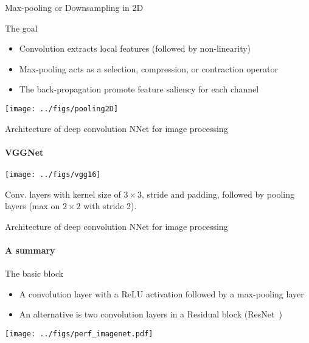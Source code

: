 \begin{frame}{Max-pooling or Downsampling in 2D}
  \begin{block}{The goal}
    \begin{itemize}
    \item Convolution extracts local features (followed by non-linearity)
    \item Max-pooling acts as a selection, compression, or contraction operator
    \item The back-propagation promote feature saliency for each channel
    \end{itemize}
  \end{block}
  \begin{center}
    \texttt{[image: ../figs/pooling2D]}
  \end{center}
\end{frame}

\begin{frame}{Architecture of deep convolution NNet for image processing}
  \framesubtitle{VGGNet~\cite{Simonyan15VGG}}
  \begin{center}
    \texttt{[image: ../figs/vgg16]}
  \end{center}
  Conv. layers with kernel size of $3\times 3$, stride and padding,
  followed by pooling layers (max on $2\times 2$ with stride 2).
\end{frame}

\begin{frame}{Architecture of deep convolution NNet for image processing}
  \framesubtitle{A summary}
  \begin{block}{The basic block}
    \begin{itemize}
    \item A convolution layer with a ReLU activation followed by a max-pooling layer
    \item An alternative is two convolution layers in a Residual block (ResNet~\cite{He16Residual})
    \end{itemize}
  \end{block}
  \begin{center}
    \texttt{[image: ../figs/perf\_imagenet.pdf]}
  \end{center}
\end{frame}



